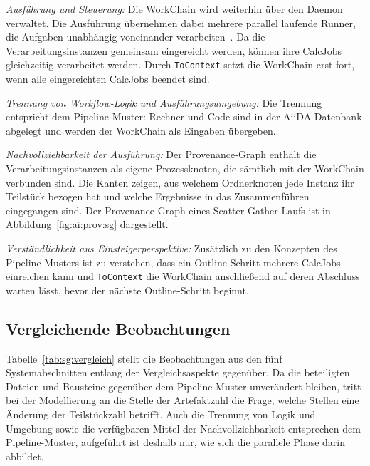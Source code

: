 \emph{Ausführung und Steuerung:} Die WorkChain wird weiterhin über
den Daemon verwaltet. Die Ausführung übernehmen dabei mehrere parallel laufende Runner, die Aufgaben unabhängig voneinander verarbeiten~\cite[S.~3]{huber2020aiida}. Da die
Verarbeitungsinstanzen gemeinsam eingereicht werden, können ihre
CalcJobs gleichzeitig verarbeitet werden. Durch \texttt{ToContext}
setzt die WorkChain erst fort, wenn alle eingereichten CalcJobs
beendet sind.


\emph{Trennung von Workflow-Logik und Ausführungsumgebung:} Die
Trennung entspricht dem Pipeline-Muster: Rechner und Code sind in
der AiiDA-Datenbank abgelegt und werden der WorkChain als Eingaben
übergeben.


\emph{Nachvollziehbarkeit der Ausführung:} Der Provenance-Graph
enthält die Verarbeitungsinstanzen als eigene Prozessknoten, die
sämtlich mit der WorkChain verbunden sind. Die Kanten zeigen, aus
welchem Ordnerknoten jede Instanz ihr Teilstück bezogen hat und
welche Ergebnisse in das Zusammenführen eingegangen sind. Der
Provenance-Graph eines Scatter-Gather-Laufs ist in
Abbildung~\ref{fig:ai:prov:sg} dargestellt.

\emph{Verständlichkeit aus Einsteigerperspektive:} Zusätzlich zu den
Konzepten des Pipeline-Musters ist zu verstehen, dass ein
Outline-Schritt mehrere CalcJobs einreichen kann und
\texttt{ToContext} die WorkChain anschließend auf deren Abschluss
warten lässt, bevor der nächste Outline-Schritt beginnt.

\subsection{Vergleichende Beobachtungen}
\label{sec:lokal:sg:zusammenfassung}

Tabelle~\ref{tab:sg:vergleich} stellt die Beobachtungen aus den fünf
Systemabschnitten entlang der Vergleichsaspekte gegenüber. Da die
beteiligten Dateien und Bausteine gegenüber dem Pipeline-Muster
unverändert bleiben, tritt bei der Modellierung an die Stelle der
Artefaktzahl die Frage, welche Stellen eine Änderung der
Teilstückzahl betrifft. Auch die Trennung von Logik und Umgebung
sowie die verfügbaren Mittel der Nachvollziehbarkeit entsprechen dem
Pipeline-Muster, aufgeführt ist deshalb nur, wie sich die parallele
Phase darin abbildet.


